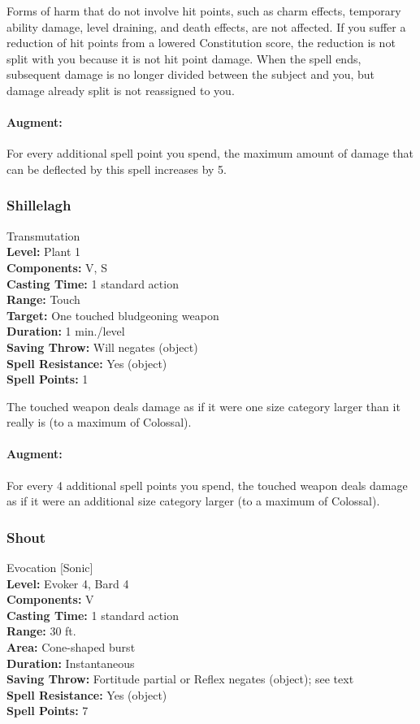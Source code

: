 Forms of harm that do not involve hit points, such as charm effects, temporary ability damage, level draining, and death effects, are not affected.
If you suffer a reduction of hit points from a lowered Constitution score, the reduction is not split with you because it is not hit point damage. 
When the spell ends, subsequent damage is no longer divided between the subject and you, but damage already split is not reassigned to you.

\paragraph{Augment:} For every additional spell point you spend, the maximum amount of damage that can be deflected by this spell increases by 5.
\subsubsection{Shillelagh}
\label{Spell:Shillelagh}
Transmutation
\\ \textbf{Level:} Plant 1
\\ \textbf{Components:} V, S
\\ \textbf{Casting Time:} 1 standard action
\\ \textbf{Range:} Touch
\\ \textbf{Target:} One touched bludgeoning weapon
\\ \textbf{Duration:} 1 min./level
\\ \textbf{Saving Throw:} Will negates (object)
\\ \textbf{Spell Resistance:} Yes (object)
\\ \textbf{Spell Points:} 1

The touched weapon deals damage as if it were one size category larger than it really is (to a maximum of Colossal).

\paragraph{Augment:} For every 4 additional spell points you spend, the touched weapon deals damage as if it were an additional size category larger (to a maximum of Colossal).
\subsubsection{Shout}
\label{Spell:Shout}
Evocation [Sonic]
\\ \textbf{Level:} Evoker 4, Bard 4
\\ \textbf{Components:} V
\\ \textbf{Casting Time:} 1 standard action
\\ \textbf{Range:} 30 ft.
\\ \textbf{Area:} Cone-shaped burst
\\ \textbf{Duration:} Instantaneous
\\ \textbf{Saving Throw:} Fortitude partial or Reflex negates (object); see text
\\ \textbf{Spell Resistance:} Yes (object)
\\ \textbf{Spell Points:} 7

